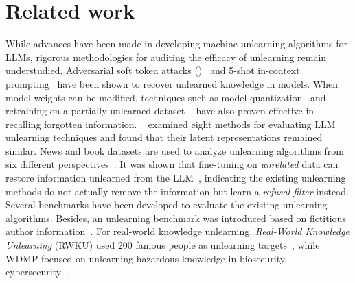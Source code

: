 \section{Related work}
While advances have been made in developing machine unlearning algorithms for LLMs, rigorous methodologies for auditing the efficacy of unlearning remain understudied.
Adversarial soft token attacks ()~\cite{schwinn2024soft} and 5-shot in-context prompting~\cite{doshi2024doesunlearningtrulyunlearn} have been shown to recover unlearned knowledge in models. 
When model weights can be modified, techniques such as model quantization~\cite{zhang2024does} and retraining on a partially unlearned dataset ~\cite{lucki2024adversarial,hu2024jogging} have also proven effective in recalling forgotten information. 
~\cite{lynch2024eight} examined eight methods for evaluating LLM unlearning techniques and found that their latent representations remained similar.
News and book datasets are used to analyze unlearning algorithms from six different perspectives~\cite{shi2024muse}.
It was shown that fine-tuning on \emph{unrelated} data can restore information unlearned from the LLM~\cite{qi2024unrelateddata}, indicating the existing unlearning methods do not actually remove the information but learn a \emph{refusal filter} instead.
Several benchmarks have been developed to evaluate the existing unlearning algorithms.
Besides, an unlearning benchmark was introduced based on fictitious author information~\cite{maini2024tofu}.
For real-world knowledge unlearning, \emph{Real-World Knowledge Unlearning} (RWKU) used 200 famous people as unlearning targets~\cite{jin2024rwku}, while WDMP focused on unlearning hazardous knowledge in biosecurity, cybersecurity~\cite{li2024wmdp}.